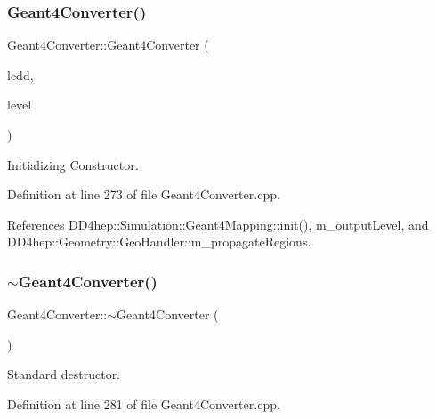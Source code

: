 \subsubsection{\texorpdfstring{Geant4\+Converter()}{Geant4Converter()}\hspace{0.1cm}{\footnotesize\ttfamily [2/2]}}
{\footnotesize\ttfamily Geant4\+Converter\+::\+Geant4\+Converter (\begin{DoxyParamCaption}\item[{\hyperlink{class_d_d4hep_1_1_simulation_1_1_geant4_mapping_a7b098323f9ea570a13d220fe3f09da41}{L\+C\+DD} \&}]{lcdd,  }\item[{\hyperlink{namespace_d_d4hep_a5b5a64d56252469451f2020a27d57d42}{Print\+Level}}]{level }\end{DoxyParamCaption})}



Initializing Constructor. 



Definition at line 273 of file Geant4\+Converter.\+cpp.



References D\+D4hep\+::\+Simulation\+::\+Geant4\+Mapping\+::init(), m\+\_\+output\+Level, and D\+D4hep\+::\+Geometry\+::\+Geo\+Handler\+::m\+\_\+propagate\+Regions.

\hypertarget{class_d_d4hep_1_1_simulation_1_1_geant4_converter_a7f6a35aaa5aa5609700e21a061c142e3}{}\label{class_d_d4hep_1_1_simulation_1_1_geant4_converter_a7f6a35aaa5aa5609700e21a061c142e3} 
\subsubsection{\texorpdfstring{$\sim$\+Geant4\+Converter()}{~Geant4Converter()}}
{\footnotesize\ttfamily Geant4\+Converter\+::$\sim$\+Geant4\+Converter (\begin{DoxyParamCaption}{ }\end{DoxyParamCaption})\hspace{0.3cm}{\ttfamily [virtual]}}



Standard destructor. 



Definition at line 281 of file Geant4\+Converter.\+cpp.




